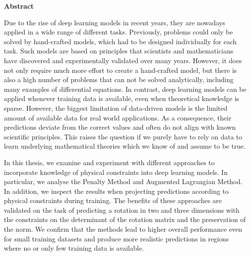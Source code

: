 


\vspace*{2cm}
\begin{center}
{\Large \textbf{Abstract}}
\end{center}
\vspace{1cm}


Due to the rise of deep learning models in recent years, they are nowadays applied in a wide range of different tasks. Previously, problems could only be solved by hand-crafted models, which had to be designed individually for each task. Such models are based on principles that scientists and mathematicians have discovered and experimentally validated over many years. However, it does not only require much more effort to create a hand-crafted model, but there is also a high number of problems that can not be solved analytically, including many examples of differential equations. In contrast, deep learning models can be applied whenever training data is available, even when theoretical knowledge is sparse. However, the biggest limitation of data-driven models is the limited amount of available data for real world applications. As a consequence, their predictions deviate from the correct values and often do not align with known scientific principles. This raises the question if we purely have to rely on data to learn underlying mathematical theories which we know of and assume to be true.




\indent In this thesis, we examine and experiment with different approaches to incorporate knowledge of physical constraints into deep learning models. In particular, we analyse the Penalty Method and Augmented Lagrangian Method. In addition, we inspect the results when projecting predictions according to physical constraints during training. The benefits of these approaches are validated on the task of predicting a rotation in two and three dimensions with the constraints on the determinant of the rotation matrix and the preservation of the norm. We confirm that the methods lead to higher overall performance even for small training datasets and produce more realistic predictions in regions where no or only few training data is available.
